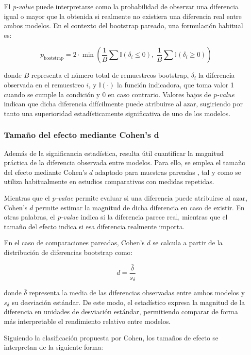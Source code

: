 El \textit{p-value} puede interpretarse como la probabilidad de observar una diferencia igual o mayor que la obtenida si realmente no existiera una diferencia real entre ambos modelos. En el contexto del bootstrap pareado, una formulación habitual es:

\[
p_{\text{bootstrap}}
=
2 \cdot
\min
\left(
\frac{1}{B}
\sum
\mathbb{I}(\delta_i \leq 0),
\;
\frac{1}{B}
\sum
\mathbb{I}(\delta_i \geq 0)
\right)
\]

donde \(B\) representa el número total de remuestreos bootstrap, \(\delta_i\) la diferencia observada en el remuestreo \(i\), y \(\mathbb{I}(\cdot)\) la función indicadora, que toma valor 1 cuando se cumple la condición y 0 en caso contrario. Valores bajos de \textit{p-value} indican que dicha diferencia difícilmente puede atribuirse al azar, sugiriendo por tanto una superioridad estadísticamente significativa de uno de los modelos.

\subsubsection{Tamaño del efecto mediante Cohen's d}

Además de la significancia estadística, resulta útil cuantificar la magnitud práctica de la diferencia observada entre modelos. Para ello, se emplea el tamaño del efecto mediante Cohen’s \(d\) adaptado para muestras pareadas \cite{cohen_statistical_2013}, tal y como se utiliza habitualmente en estudios comparativos con medidas repetidas.

Mientras que el \textit{p-value} permite evaluar si una diferencia puede atribuirse al azar, Cohen’s \(d\) permite estimar la magnitud de dicha diferencia en caso de existir. En otras palabras, el \textit{p-value} indica si la diferencia parece real, mientras que el tamaño del efecto indica si esa diferencia realmente importa.

En el caso de comparaciones pareadas, Cohen’s \(d\) se calcula a partir de la distribución de diferencias bootstrap como:

\[
d =
\frac{\bar{\delta}}
{s_{\delta}}
\]

donde \(\bar{\delta}\) representa la media de las diferencias observadas entre ambos modelos y \(s_{\delta}\) su desviación estándar. De este modo, el estadístico expresa la magnitud de la diferencia en unidades de desviación estándar, permitiendo comparar de forma más interpretable el rendimiento relativo entre modelos.

Siguiendo la clasificación propuesta por Cohen, los tamaños de efecto se interpretan de la siguiente forma:


